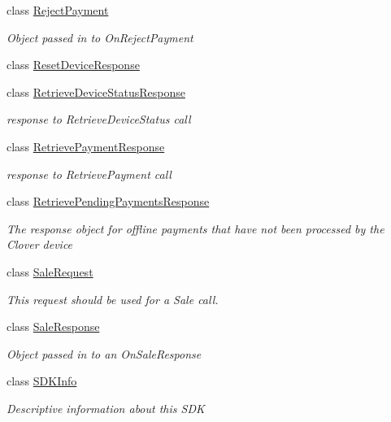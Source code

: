 \begin{DoxyCompactItemize}
class \hyperlink{classcom_1_1clover_1_1remotepay_1_1sdk_1_1_reject_payment}{Reject\+Payment}
\begin{DoxyCompactList}\small\item\em Object passed in to On\+Reject\+Payment \end{DoxyCompactList}\item 
class \hyperlink{classcom_1_1clover_1_1remotepay_1_1sdk_1_1_reset_device_response}{Reset\+Device\+Response}
\item 
class \hyperlink{classcom_1_1clover_1_1remotepay_1_1sdk_1_1_retrieve_device_status_response}{Retrieve\+Device\+Status\+Response}
\begin{DoxyCompactList}\small\item\em response to Retrieve\+Device\+Status call \end{DoxyCompactList}\item 
class \hyperlink{classcom_1_1clover_1_1remotepay_1_1sdk_1_1_retrieve_payment_response}{Retrieve\+Payment\+Response}
\begin{DoxyCompactList}\small\item\em response to Retrieve\+Payment call \end{DoxyCompactList}\item 
class \hyperlink{classcom_1_1clover_1_1remotepay_1_1sdk_1_1_retrieve_pending_payments_response}{Retrieve\+Pending\+Payments\+Response}
\begin{DoxyCompactList}\small\item\em The response object for offline payments that have not been processed by the Clover device \end{DoxyCompactList}\item 
class \hyperlink{classcom_1_1clover_1_1remotepay_1_1sdk_1_1_sale_request}{Sale\+Request}
\begin{DoxyCompactList}\small\item\em This request should be used for a Sale call. \end{DoxyCompactList}\item 
class \hyperlink{classcom_1_1clover_1_1remotepay_1_1sdk_1_1_sale_response}{Sale\+Response}
\begin{DoxyCompactList}\small\item\em Object passed in to an On\+Sale\+Response \end{DoxyCompactList}\item 
class \hyperlink{classcom_1_1clover_1_1remotepay_1_1sdk_1_1_s_d_k_info}{S\+D\+K\+Info}
\begin{DoxyCompactList}\small\item\em Descriptive information about this S\+DK \end{DoxyCompactList}\item 

\end{DoxyCompactItemize}
